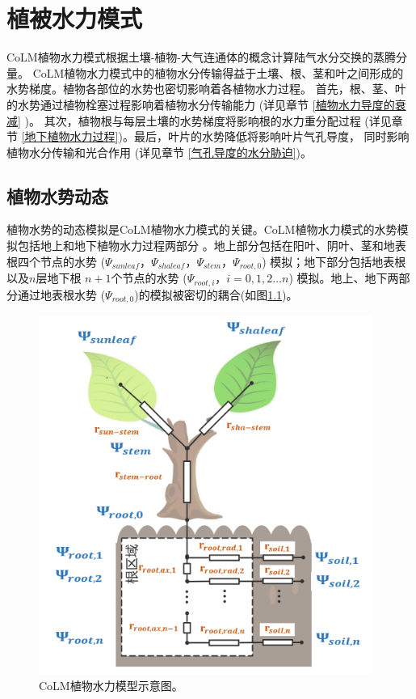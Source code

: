 \chapter{植被水力模式}

CoLM植物水力模式根据土壤-植物-大气连通体的概念计算陆气水分交换的蒸腾分量。
CoLM植物水力模式中的植物水分传输得益于土壤、根、茎和叶之间形成的水势梯度。植物各部位的水势也密切影响着各植物水力过程。
首先，根、茎、叶的水势通过植物栓塞过程影响着植物水分传输能力 (详见章节 \ref{植物水力导度的衰减} )。
其次，植物根与每层土壤的水势梯度将影响根的水力重分配过程 (详见章节 \ref{地下植物水力过程})。最后，叶片的水势降低将影响叶片气孔导度，
同时影响植物水分传输和光合作用 (详见章节 \ref{气孔导度的水分胁迫})。
\section{植物水势动态}\label{植物水势动态}
植物水势的动态模拟是CoLM植物水力模式的关键。CoLM植物水力模式的水势模拟包括地上和地下植物水力过程两部分
。地上部分包括在阳叶、阴叶、茎和地表根四个节点的水势 ($\Psi_{sunleaf}$，$\Psi_{shaleaf}$，$\Psi_{stem}$，$\Psi_{root,0}$)
 模拟；地下部分包括地表根以及$n$层地下根 $n+1$个节点的水势 ($\Psi_{root,i}$，$i=0,1,2{\ldots}n$) 模拟。地上、地下两部分通过地表根水势
 ($\Psi_{root,0}$)的模拟被密切的耦合(如图\ref{fig:CoLM植物水力模型示意图})。
 {
\begin{figure}[]
\centering
\includegraphics{Figures/植被水力模式/CoLM植物水力模型示意图.png}
\caption{CoLM植物水力模型示意图。}
\label{fig:CoLM植物水力模型示意图}
\end{figure}
}


